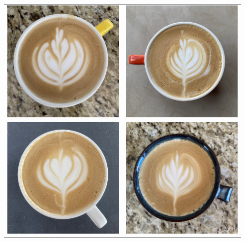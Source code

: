 \begin{center}
  \setlength{\tabcolsep}{10pt}
  \renewcommand{\arraystretch}{3.3}
  \begin{tabular}{cc}
    \includegraphics[width=6cm]{img/latte-06-26.jpg} &
    \includegraphics[width=6cm]{img/latte-06-29.jpg} \\
    \includegraphics[width=6cm]{img/latte-07-08.jpg} &
    \includegraphics[width=6cm]{img/latte-07-04.jpg} \\
  \end{tabular}
\end{center}
